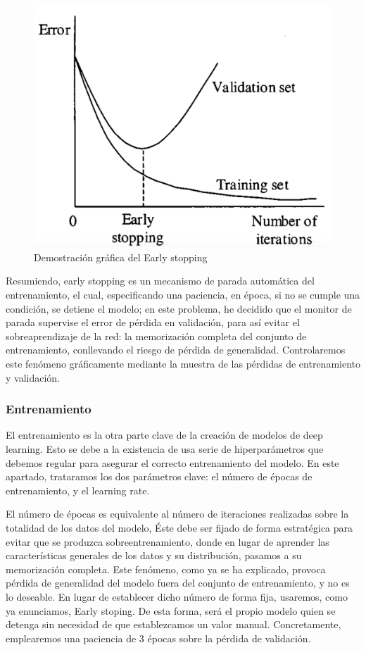 \begin{figure}[H]
	\centering
	\label {earlystopping}
	\includegraphics[scale = 0.25]{imagenes/earlystopping.png}
	\caption{Demostración gráfica del Early stopping}
\end{figure}

Resumiendo, early stopping es un mecanismo de parada automática del entrenamiento, el cual, especificando una paciencia, en época, si no se cumple una condición, se detiene el modelo; en este problema, he decidido que el monitor de parada supervise el error de pérdida en validación, para así evitar el sobreaprendizaje de la red: la memorización completa del conjunto de entrenamiento, conllevando el riesgo de pérdida de generalidad. Controlaremos este fenómeno gráficamente mediante la muestra de las pérdidas de entrenamiento y validación.

\subsubsection{Entrenamiento}

El entrenamiento es la otra parte clave de la creación de modelos de deep learning. Esto se debe a la existencia de usa serie de hiperparámetros que debemos regular para asegurar el correcto entrenamiento del modelo. En este apartado, trataramos los dos parámetros clave: el número de épocas de entrenamiento, y el learning rate.

El número de épocas es equivalente al número de iteraciones realizadas sobre la totalidad de los datos del modelo, Éste debe ser fijado de forma estratégica para evitar que se produzca sobreentrenamiento, donde en lugar de aprender las características generales de los datos y su distribución, pasamos a su memorización completa. Este fenómeno, como ya se ha explicado, provoca pérdida de generalidad del modelo fuera del conjunto de entrenamiento, y no es lo deseable. En lugar de establecer dicho número de forma fija, usaremos, como ya enunciamos, Early stoping. De esta forma, será el propio modelo quien se detenga sin necesidad de que establezcamos un valor manual. Concretamente, emplearemos una paciencia de 3 épocas sobre la pérdida de validación.\\

